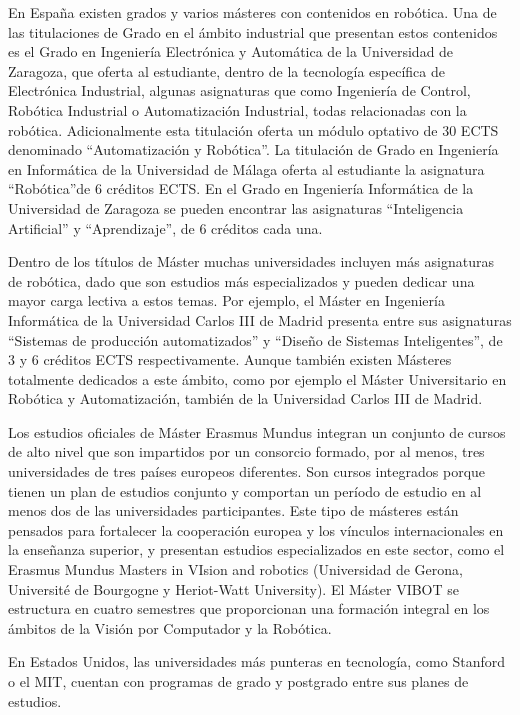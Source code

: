 En España existen grados y varios másteres con contenidos en robótica. Una de las titulaciones de Grado en el ámbito industrial que presentan estos contenidos es el Grado en Ingeniería Electrónica y Automática de la Universidad de Zaragoza, que oferta al estudiante, dentro de la tecnología específica de Electrónica Industrial, algunas asignaturas que como Ingeniería de Control, Robótica Industrial o Automatización Industrial, todas relacionadas con la robótica. Adicionalmente esta titulación oferta un  módulo optativo de 30 ECTS denominado “Automatización y Robótica”. La titulación de Grado en Ingeniería en Informática de la Universidad de Málaga oferta al estudiante la asignatura \textquotedblleft Robótica\textquotedblright  de 6 créditos ECTS. En el Grado en Ingeniería Informática de la Universidad de Zaragoza se pueden encontrar las asignaturas “Inteligencia Artificial” y “Aprendizaje”, de 6 créditos cada una. 

Dentro de los títulos de Máster muchas universidades incluyen más asignaturas de robótica, dado que son estudios más especializados y pueden dedicar una mayor carga lectiva a estos temas. Por ejemplo, el Máster en Ingeniería Informática de la Universidad Carlos III de Madrid presenta entre sus asignaturas “Sistemas de producción automatizados” y “Diseño de Sistemas Inteligentes”, de 3 y 6 créditos ECTS respectivamente. Aunque también existen Másteres totalmente dedicados a este ámbito, como por ejemplo el Máster Universitario en Robótica y Automatización,  también de la Universidad Carlos III de Madrid.

Los estudios oficiales de Máster Erasmus Mundus integran un conjunto de cursos de alto nivel que son impartidos por un consorcio formado, por al menos, tres universidades de tres países europeos diferentes. Son cursos integrados porque tienen un plan de estudios conjunto y comportan un período de estudio en al menos dos de las universidades participantes. Este tipo de másteres están pensados para fortalecer la cooperación europea y los vínculos internacionales en la enseñanza superior, y presentan estudios especializados en este sector, como el Erasmus Mundus Masters in VIsion and robotics (Universidad de Gerona, Université de Bourgogne y Heriot-Watt University). El Máster VIBOT se estructura en cuatro semestres que proporcionan una formación integral en los ámbitos de la Visión por Computador y la Robótica.

En Estados Unidos, las universidades más punteras en tecnología, como Stanford o el MIT, cuentan con programas de grado y postgrado entre sus planes de estudios.

